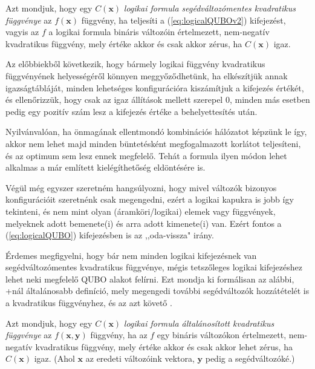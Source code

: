 \begin{definition}\label{def:kvadFunc}
	Azt mondjuk, hogy egy $C(\mathbf{x})$ \textit{logikai formula segédváltozómentes kvadratikus függvénye} az $f(\mathbf{x})$ függvény, ha teljesíti a (\ref{eq:logicalQUBOv2}) kifejezést, vagyis az $f$ a logikai formula bináris változóin értelmezett, nem-negatív kvadratikus függvény, mely értéke akkor és csak akkor zérus, ha $C(\mathbf{x})$ igaz.	
\end{definition}

Az előbbiekből következik, hogy bármely logikai függvény kvadratikus függvényének helyességéről könnyen meggyőződhetünk, ha elkészítjük annak igazságtábláját, minden lehetséges konfigurációra kiszámítjuk a kifejezés értékét, és ellenőrizzük, hogy csak az igaz állítások mellett szerepel 0, minden más esetben pedig egy pozitív szám lesz a kifejezés értéke a behelyettesítés után.

Nyilvánvalóan, ha önmagának ellentmondó kombinációs hálózatot képzünk le így, akkor nem lehet majd minden büntetésként megfogalmazott korlátot teljesíteni, és az optimum sem lesz ennek megfelelő. Tehát a formula ilyen módon lehet alkalmas a már említett kielégíthetőség eldöntésére is.

Végül még egyszer szeretném hangsúlyozni, hogy mivel változók bizonyos konfigurációit szeretnénk csak megengedni, ezért a logikai kapukra is jobb így tekinteni, és nem mint olyan (áramköri/logikai) elemek vagy függvények, melyeknek adott bemenete(i) és arra adott kimenete(i) van. Ezért fontos a (\ref{eq:logicalQUBO}) kifejezésben is az ,,oda-vissza" irány.

Érdemes megfigyelni, hogy bár nem minden logikai kifejezésnek van segédváltozómentes kvadratikus függvénye, mégis tetszőleges logikai kifejezéshez lehet neki megfelelő QUBO alakot felírni. Ezt mondja ki formálisan az alábbi, \az+nál általánosabb definíció, mely megengedi további segédváltozók hozzátételét is a kvadratikus függvényhez, és az azt követő .

\begin{definition}\label{def:kvadFuncgen}
	Azt mondjuk, hogy egy $C(\mathbf{x})$ \textit{logikai formula általánosított kvadratikus függvénye} az $f(\mathbf{x},\mathbf{y})$ függvény, ha az $f$ egy bináris változókon értelmezett, nem-negatív kvadratikus függvény, mely értéke akkor és csak akkor lehet zérus, ha $C(\mathbf{x})$ igaz. (Ahol $\mathbf{x}$ az eredeti változóink vektora, $\mathbf{y}$ pedig a segédváltozóké.)
\end{definition}

